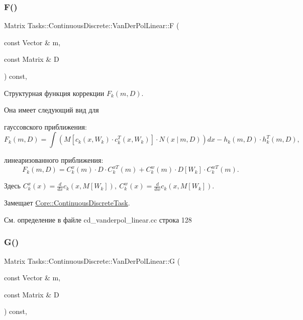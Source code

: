 \subsubsection{\texorpdfstring{F()}{F()}}
{\footnotesize\ttfamily Matrix Tasks\+::\+Continuous\+Discrete\+::\+Van\+Der\+Pol\+Linear\+::F (\begin{DoxyParamCaption}\item[{const Vector \&}]{m,  }\item[{const Matrix \&}]{D }\end{DoxyParamCaption}) const\hspace{0.3cm}{\ttfamily [override]}, {\ttfamily [virtual]}}



Структурная функция коррекции $F_k(m, D)$. 

Она имеет следующий вид для


\begin{DoxyItemize}
\item гауссовского приближения\+: \[F_k(m, D) = \int (M[c_k(x,W_k)\cdot c_k^T(x, W_k)] \cdot N(x\ |\ m,D))dx - h_k(m,D)\cdot h_k^T(m,D),\]
\item линеаризованного приближения\+: \[F_k(m, D) = C_k^x(m)\cdot D\cdot C_k^{xT}(m) + C_k^w(m)\cdot D[W_k]\cdot C_k^{wT}(m).\]
\end{DoxyItemize}

Здесь $C_k^x(x) = \frac{d}{dx} c_k(x, M[W_k]),\ C_k^w(x) = \frac{d}{dw} c_k(x, M[W_k])$. 

Замещает \hyperlink{class_core_1_1_continuous_discrete_task_a08947ea4d4eb819e0e8530e682a1a377}{Core\+::\+Continuous\+Discrete\+Task}.



См. определение в файле cd\+\_\+vanderpol\+\_\+linear.\+cc строка 128

\hypertarget{class_tasks_1_1_continuous_discrete_1_1_van_der_pol_linear_aad1f3c80a043157b90ba0b55ba2390b1}{}\label{class_tasks_1_1_continuous_discrete_1_1_van_der_pol_linear_aad1f3c80a043157b90ba0b55ba2390b1} 
\subsubsection{\texorpdfstring{G()}{G()}}
{\footnotesize\ttfamily Matrix Tasks\+::\+Continuous\+Discrete\+::\+Van\+Der\+Pol\+Linear\+::G (\begin{DoxyParamCaption}\item[{const Vector \&}]{m,  }\item[{const Matrix \&}]{D }\end{DoxyParamCaption}) const\hspace{0.3cm}{\ttfamily [override]}, {\ttfamily [virtual]}}



